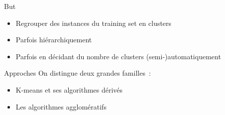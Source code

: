 \begin{frame}{But}
  \begin{itemize}[<+->]
    \item Regrouper des instances du training set en \og{}clusters\fg{}
    \item Parfois hiérarchiquement
    \item Parfois en décidant du nombre de clusters (semi-)automatiquement
  \end{itemize}
\end{frame}

\begin{frame}{Approches}
  On distingue deux grandes familles~:

  \begin{itemize}[<+->]
    \item K-means et ses algorithmes dérivés
    \item Les algorithmes agglomératifs
  \end{itemize}
\end{frame}